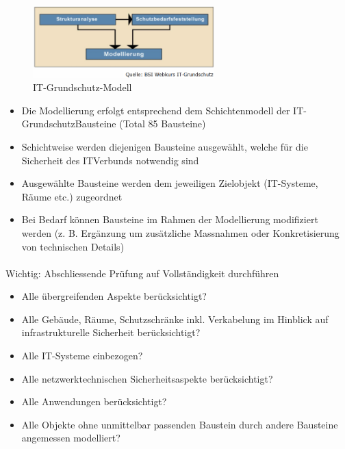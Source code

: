 \documentclass[10pt,a4paper]{article}
\begin{document}
\begin{figure}[H]
    \begin{center}
    \includegraphics[width=7cm]{images/IT-Grundschutz-Modell.png}
    \caption{IT-Grundschutz-Modell}
    \label{IT-Grundschutz-Modell}
    \end{center}
\end{figure}

\begin{itemize}[noitemsep,topsep=0pt,leftmargin=*]
    \item Die Modellierung erfolgt entsprechend
    dem Schichtenmodell der IT-GrundschutzBausteine (Total 85 Bausteine)
    \item Schichtweise werden diejenigen Bausteine
    ausgewählt, welche für die Sicherheit des ITVerbunds notwendig sind
    \item Ausgewählte Bausteine werden dem jeweiligen
    Zielobjekt (IT-Systeme, Räume etc.) zugeordnet
    \item Bei Bedarf können Bausteine im Rahmen der
    Modellierung modifiziert werden (z. B. Ergänzung um
    zusätzliche Massnahmen oder Konkretisierung von
    technischen Details)
\end{itemize}

\paragraph*{}Wichtig: Abschliessende Prüfung auf Vollständigkeit
durchführen

\begin{itemize}[noitemsep,topsep=0pt,leftmargin=*]
    \item Alle übergreifenden Aspekte berücksichtigt?
    \item Alle Gebäude, Räume, Schutzschränke inkl. Verkabelung
    im Hinblick auf infrastrukturelle Sicherheit
    berücksichtigt?
    \item Alle IT-Systeme einbezogen?
    \item Alle netzwerktechnischen Sicherheitsaspekte
    berücksichtigt?
    \item Alle Anwendungen berücksichtigt?
    \item Alle Objekte ohne unmittelbar passenden Baustein durch
    andere Bausteine angemessen modelliert?
\end{itemize}
\end{document}
